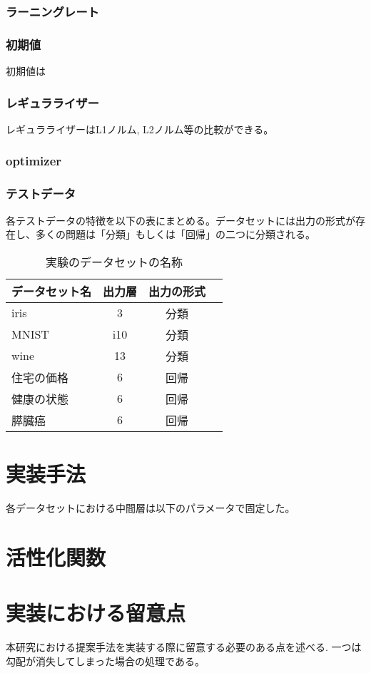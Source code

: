 \subsubsection{ラーニングレート}

\subsubsection{初期値}
初期値は
\subsubsection{レギュラライザー}
レギュラライザーはL1ノルム, L2ノルム等の比較ができる。
\subsubsection{optimizer}
\subsubsection{テストデータ}
各テストデータの特徴を以下の表にまとめる。データセットには出力の形式が存在し、多くの問題は「分類」もしくは「回帰」の二つに分類される。


\begin{table}[htbp]
    \begin{center}
        \caption{実験のデータセットの名称}
        \vspace{5mm} 
        \begin{tabular}{l*{2}{c}r}
        データセット名      & 出力層 & 出力の形式 \\
        \hline
        iris            & 3  & 分類 \\
        MNIST               & i10 & 分類  \\
        wine        & 13 & 分類 \\
        住宅の価格           & 6 & 回帰 \\
        健康の状態           & 6 & 回帰 \\
        膵臓癌           & 6 & 回帰 \\
        \end{tabular}
    \end{center}
\end{table}



\section{実装手法}

各データセットにおける中間層は以下のパラメータで固定した。



\section{活性化関数}



\section{実装における留意点}
本研究における提案手法を実装する際に留意する必要のある点を述べる.
一つは勾配が消失してしまった場合の処理である。

\section{}

